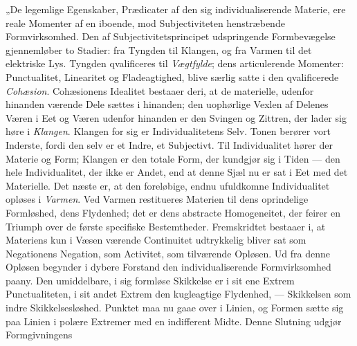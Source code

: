 \documentclass[12pt,a4paper]{book}
\begin{document}
„De legemlige Egenskaber, Prædicater af den sig individualiserende
Materie, ere reale Momenter af en iboende, mod Subjectiviteten
henstræbende Formvirksomhed. Den af Subjectivitetsprincipet
udspringende Formbevægelse gjennemløber to Stadier: fra Tyngden til
Klangen, og fra Varmen til det elektriske Lys. Tyngden qvalificeres
til \emph{Vægtfylde}; dens articulerende Momenter: Punctualitet,
Linearitet og Fladeagtighed, blive særlig satte i den qvalificerede
\emph{Cohæsion}. Cohæsionens Idealitet bestaaer deri, at de
materielle, udenfor hinanden værende Dele sættes i hinanden; den
uophørlige Vexlen af Delenes Væren i Eet og Væren udenfor hinanden er
den Svingen og Zittren, der lader sig høre i \emph{Klangen}. Klangen
for sig er Individualitetens Selv. Tonen berører vort Inderste, fordi
den selv er et Indre, et
Subjectivt. Til Individualitet hører der Materie og Form; Klangen er
den totale Form, der kundgjør sig i Tiden --- den hele Individualitet,
der ikke er Andet, end at denne Sjæl nu er sat i Eet med det
Materielle. Det næste er, at den foreløbige, endnu ufuldkomne
Individualitet opløses i \emph{Varmen}. Ved Varmen restitueres
Materien til dens oprindelige Formløshed, dens Flydenhed; det er dens
abstracte Homogeneitet, der feirer en Triumph over de første
specifiske Bestemtheder. Fremskridtet bestaaer i, at Materiens kun i
Væsen værende Continuitet udtrykkelig bliver sat som Negationens
Negation, som Activitet, som tilværende Opløsen. Ud fra denne Opløsen
begynder i dybere Forstand den individualiserende Formvirksomhed
paany. Den umiddelbare, i sig formløse Skikkelse er i sit ene Extrem
Punctualiteten, i sit andet Extrem den kugleagtige Flydenhed, ---
Skikkelsen som indre Skikkelsesløshed. Punktet maa nu gaae over i
Linien, og Formen sætte sig paa Linien i polære Extremer med en
indifferent Midte. Denne Slutning udgjør Formgivningens
\end{document}
